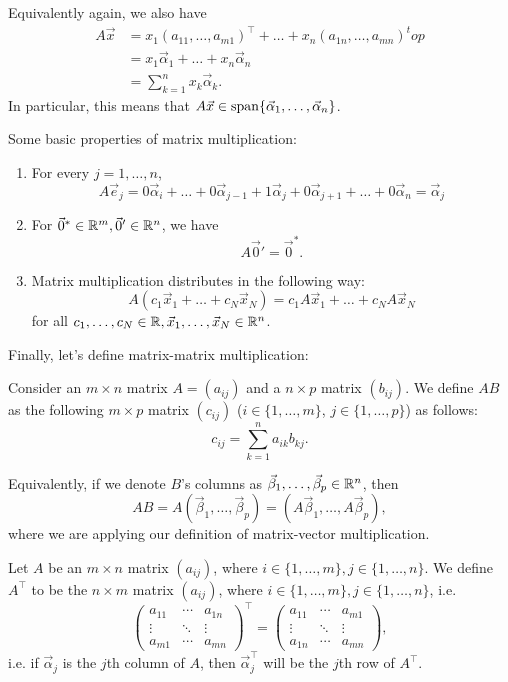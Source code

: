 \documentclass[main.tex]{subfiles}
\begin{document}
Equivalently again, we also have
\begin{align*}
    A\vec{x} &= x_1 (a_{11}, \ldots , a_{m1})^\top + \ldots + x_n (a_{1n}, \ldots, a_{mn})^top \\
    &= x_1\vec{\alpha}_1 + \ldots + x_n\vec{\alpha}_n \\
    &= \boxed{\sum_{k = 1}^n x_k\vec{\alpha}_k}.
\end{align*}
In particular, this means that $A\vec{x}\in \operatorname{span}\{\vec{\alpha}_1, \ldots , \vec{\alpha}_n\}$.
\begin{proposition}
    Some basic properties of matrix multiplication:
    \begin{enumerate}
        \item For every $j = 1, \ldots , n$,
        \[A\vec{e}_j = 0\vec{\alpha}_{i} + \ldots + 0\vec{\alpha}_{j - 1} + 1\vec{\alpha}_j + 0\vec{\alpha}_{j + 1} + \ldots + 0\vec{\alpha}_n = \vec{\alpha}_j\]
        \item For $\vec{0}^*\in \mathbb R^m, \vec{0}'\in \mathbb R^n$, we have
        \[A\vec{0}' = \vec{0}^*.\]
        \item Matrix multiplication distributes in the following way:
        \[A(c_1\vec{x}_1 + \ldots + c_N\vec{x}_N) = c_1A\vec{x}_1 + \ldots + c_NA\vec{x}_N\]
        for all $c_1, \ldots , c_N\in \mathbb R, \vec{x}_1, \ldots , \vec{x}_N\in \mathbb R^n$.
    \end{enumerate}
\end{proposition}
Finally, let's define matrix-matrix multiplication:
\begin{definition}
    Consider an $m\times n$ matrix $A = (a_{ij})$ and a $n\times p$ matrix $(b_{ij})$. We define $AB$ as the following $m\times p$ matrix $(c_{ij})$ ($i\in \{1, \ldots , m\}$, $j \in \{1, \ldots , p\}$) as follows:
    \[c_{ij} = \sum_{k = 1}^n a_{ik}b_{kj}.\]
\end{definition}
Equivalently, if we denote $B$'s columns as $\vec{\beta}_1, \ldots , \vec{\beta}_p\in \mathbb R^n$, then
\[AB = A(\vec{\beta}_1, \ldots , \vec{\beta}_p) = (A\vec{\beta}_1 , \ldots , A\vec{\beta}_p),\]
where we are applying our definition of matrix-vector multiplication.

\begin{definition}
    Let $A$ be an $m\times n$ matrix $(a_{ij})$, where $i\in \{1, \ldots , m\}, j \in \{1, \ldots , n\}$. We define $A^\top$ to be the $n\times m$ matrix $(a_{ij})$, where $i\in \{1, \ldots , m\}, j\in \{1, \ldots , n\}$, i.e.
    \[\begin{pmatrix}
    a_{11} & \cdots & a_{1n} \\
    \vdots & \ddots & \vdots \\
    a_{m1} & \cdots & a_{mn}
    \end{pmatrix}^\top = \begin{pmatrix}
    a_{11} & \cdots & a_{m1} \\
    \vdots & \ddots & \vdots \\
    a_{1n} & \cdots & a_{mn}
    \end{pmatrix},\]
    i.e. if $\vec{\alpha}_j$ is the $j$th column of $A$, then $\vec{\alpha}_j^\top$ will be the $j$th row of $A^\top$.
\end{definition}
\end{document}
